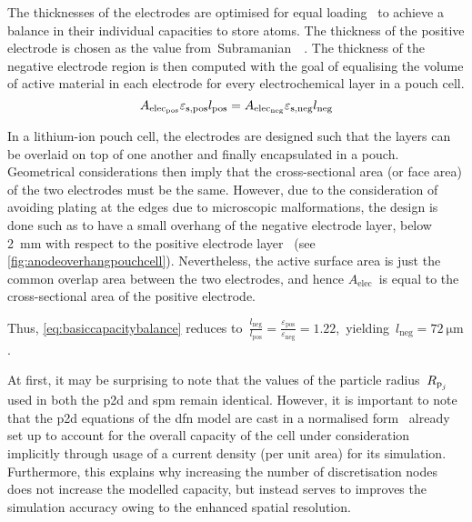 The  thicknesses  of the  electrodes  are  optimised  for equal  loading  \ie~to
achieve   a  balance   in   their  individual   capacities   to  store   
atoms.  The  thickness  of  the  positive  electrode  is  chosen  as  the  value
from~Subramanian~\etal{}~\cite{Subramanian2009}. The  thickness of  the negative
electrode region  is then  computed with  the goal of  equalising the  volume of
active material  in each electrode  for every  electrochemical layer in  a pouch
cell.
\begin{equation}\label{eq:basiccapacitybalance}
    A_{\text{elec}_\text{pos}}\varepsilon_{\text{s,pos}} l_\text{pos} = A_{\text{elec}_\text{neg}}\varepsilon_{\text{s,neg}} l_\text{neg}
\end{equation}

In a  lithium-ion pouch cell, the  electrodes are designed such  that the layers
can be  overlaid on  top of  one another  and finally  encapsulated in  a pouch.
Geometrical considerations  then imply  that the  cross-sectional area  (or face
area) of the two electrodes must be  the same. However, due to the consideration
of  avoiding  plating  at  the  edges  due  to  microscopic  malformations,  the
design  is done  such as  to have  a small  overhang of  the negative  electrode
layer,  below  \SI{2}{\milli\meter}  with  respect  to  the  positive  electrode
layer~\cite{Bond2017} (see \cref{fig:anodeoverhangpouchcell}). Nevertheless, the
active surface area is just the  common overlap area between the two electrodes,
and hence $A_\text{elec}$~is equal to the cross-sectional area  of the positive
electrode.

Thus, \cref{eq:basiccapacitybalance} reduces to~${\frac{l_\text{neg}}{l_\text{pos}} =
\frac{\varepsilon_\text{pos}}{\varepsilon_\text{neg}} = 1.22}$,~yielding~${l_\text{neg} = \SI{72}{\micro\meter}}$.

At  first,  it may  be  surprising  to note  that  the  values of  the  particle
radius~$R_{{\text{p}_j}}$  used  in both  the  \gls{p2d}  and \gls{spm}  remain  identical.
However, it is  important to note that the \gls{p2d}  equations of the \gls{dfn}
model  are cast  in a  normalised form  \ie~already set  up to  account for  the
overall capacity of  the cell under consideration implicitly through  usage of a
current density (per  unit area) for its simulation.  Furthermore, this explains
why increasing the number of discretisation nodes does not increase the modelled
capacity, but  instead serves to improves  the simulation accuracy owing  to the
enhanced spatial resolution.

